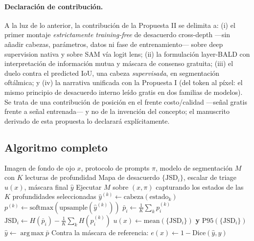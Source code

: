 \documentclass[12pt,a4paper]{article}
\newcommand{\JSD}{\mathrm{JSD}}
\DeclareMathOperator*{\argmax}{arg\,max}
\begin{document}
\paragraph{Declaración de contribución.}
A la luz de lo anterior, la contribución de la Propuesta II se delimita a: (i) el primer montaje \emph{estrictamente training-free} de desacuerdo cross-depth ---sin añadir cabezas, parámetros, datos ni fase de entrenamiento--- sobre deep supervision nativa y sobre SAM vía logit lens; (ii) la formulación layer-BALD con interpretación de información mutua y máscara de consenso gratuita; (iii) el duelo contra el predicted IoU, una cabeza \emph{supervisada}, en segmentación oftálmica; y (iv) la narrativa unificada con la Propuesta I (del token al píxel: el mismo principio de desacuerdo interno leído gratis en dos familias de modelos).
Se trata de una contribución de posición en el frente costo/calidad ---señal gratis frente a señal entrenada--- y no de la invención del concepto; el manuscrito derivado de esta propuesta lo declarará explícitamente.

\subsection{Algoritmo completo}

\begin{algorithm}[H]
\caption{Pipeline de señal de incertidumbre cross-depth (Propuesta II)}
\label{alg:pipeline-seg}
\begin{algorithmic}[1]
\Require Imagen de fondo de ojo $x$, protocolo de prompts $\pi$, modelo de segmentación $M$ con $K$ lecturas de profundidad
\Ensure Mapa de desacuerdo $\{\JSD_i\}$, escalar de triage $u(x)$, máscara final $\hat{y}$
\State Ejecutar $M$ sobre $(x, \pi)$ capturando los estados de las $K$ profundidades seleccionadas
    \State $\hat{y}^{(k)} \gets \text{cabeza}(\text{estado}_k)$  
    \State $p^{(k)} \gets \text{softmax}(\text{upsample}(\hat{y}^{(k)}))$  
\EndFor
{}
    \State $\bar{p}_i \gets \frac{1}{K}\sum_k p_i^{(k)}$
    \State $\JSD_i \gets H(\bar{p}_i) - \frac{1}{K}\sum_k H(p_i^{(k)})$  
\EndFor
\State $u(x) \gets \text{mean}(\{\JSD_i\})$ \textbf{ y } $\mathrm{P95}(\{\JSD_i\})$  
\State $\hat{y} \gets \argmax \bar{p}$  
\State Contra la máscara de referencia: $e(x) \gets 1 - \mathrm{Dice}(\hat{y}, y)$  
\end{algorithmic}
\end{algorithm}
\end{document}
